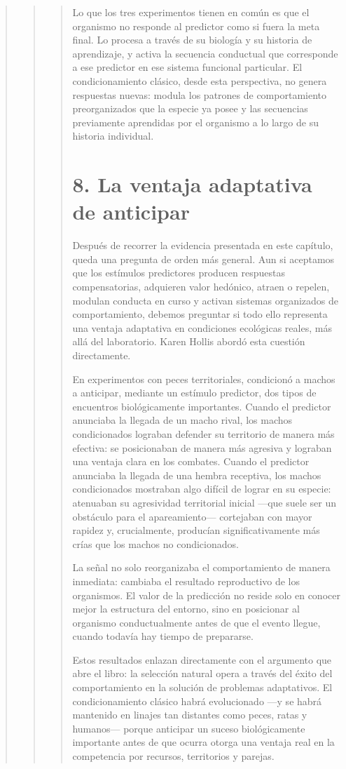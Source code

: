 \documentclass[
  letterpaper,
  DIV=11,
  numbers=noendperiod]{scrreprt}
\begin{document}
\begin{tcolorbox}[enhanced jigsaw, toprule=.15mm, arc=.35mm, colback=white, opacityback=0, colframe=quarto-callout-note-color-frame, breakable, rightrule=.15mm, left=2mm, leftrule=.75mm, bottomrule=.15mm]
\begin{quote}
\begin{quote}
\begin{quote}
Lo que los tres experimentos tienen en común es que el organismo no
responde al predictor como si fuera la meta final. Lo procesa a través
de su biología y su historia de aprendizaje, y activa la secuencia
conductual que corresponde a ese predictor en ese sistema funcional
particular. El condicionamiento clásico, desde esta perspectiva, no
genera respuestas nuevas: modula los patrones de comportamiento
preorganizados que la especie ya posee y las secuencias previamente
aprendidas por el organismo a lo largo de su historia individual.

\section{8. La ventaja adaptativa de
anticipar}\label{la-ventaja-adaptativa-de-anticipar}

Después de recorrer la evidencia presentada en este capítulo, queda una
pregunta de orden más general. Aun si aceptamos que los estímulos
predictores producen respuestas compensatorias, adquieren valor
hedónico, atraen o repelen, modulan conducta en curso y activan sistemas
organizados de comportamiento, debemos preguntar si todo ello representa
una ventaja adaptativa en condiciones ecológicas reales, más allá del
laboratorio. Karen Hollis abordó esta cuestión directamente.

En experimentos con peces territoriales, condicionó a machos a
anticipar, mediante un estímulo predictor, dos tipos de encuentros
biológicamente importantes. Cuando el predictor anunciaba la llegada de
un macho rival, los machos condicionados lograban defender su territorio
de manera más efectiva: se posicionaban de manera más agresiva y
lograban una ventaja clara en los combates. Cuando el predictor
anunciaba la llegada de una hembra receptiva, los machos condicionados
mostraban algo difícil de lograr en su especie: atenuaban su agresividad
territorial inicial ---que suele ser un obstáculo para el
apareamiento--- cortejaban con mayor rapidez y, crucialmente, producían
significativamente más crías que los machos no condicionados.

La señal no solo reorganizaba el comportamiento de manera inmediata:
cambiaba el resultado reproductivo de los organismos. El valor de la
predicción no reside solo en conocer mejor la estructura del entorno,
sino en posicionar al organismo conductualmente antes de que el evento
llegue, cuando todavía hay tiempo de prepararse.

Estos resultados enlazan directamente con el argumento que abre el
libro: la selección natural opera a través del éxito del comportamiento
en la solución de problemas adaptativos. El condicionamiento clásico
habrá evolucionado ---y se habrá mantenido en linajes tan distantes como
peces, ratas y humanos--- porque anticipar un suceso biológicamente
importante antes de que ocurra otorga una ventaja real en la competencia
por recursos, territorios y parejas.


\end{quote}
\end{quote}
\end{quote}
\end{tcolorbox}
\end{document}
